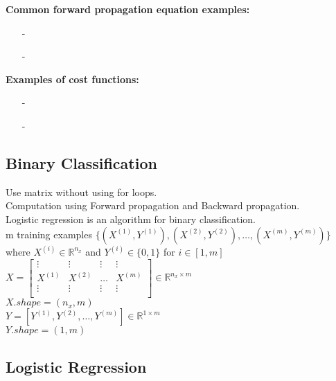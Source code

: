 \documentclass{article}
\begin{document}
    \textbf{Common forward propagation equation examples:}
    \begin{itemize}
        \item[-]{}
        \item[-]{}
    \end{itemize}

    \textbf{Examples of cost functions:}
    \begin{itemize}
        \item[-]{}
        \item[-]{}
    \end{itemize}

\newpage
\subsection{Binary Classification}

    Use matrix without using for loops.\\
    Computation using Forward propagation and Backward propagation.\\
    Logistic regression is an algorithm for binary classification.\\

    m training examples
    $\{(X^{(1)}, Y^{(1)}), (X^{(2)}, Y^{(2)}), \hdots, (X^{(m)}, Y^{(m)})\}$ \\
    where $X^{(i)} \in \mathbb{R}^{n_x}$ and $Y^{(i)} \in \{0,1\}$ for $i \in [1,m]$ \\

    $X =
    \begin{bmatrix}
        \vdots & \vdots & \vdots & \vdots\\
        X^{(1)} & X^{(2)} & \dots & X^{(m)} \\
        \vdots & \vdots & \vdots & \vdots\\
    \end{bmatrix}
    \in \mathbb{R}^{n_x \times m}
    $\\

    $X.shape = (n_x, m)$\\

    $Y = [Y^{(1)}, Y^{(2)}, \hdots, Y^{(m)}]
    \in \mathbb{R}^{1 \times m}
    $\\

    $Y.shape = (1, m)$\\

\newpage
\subsection{Logistic Regression}
\end{document}
